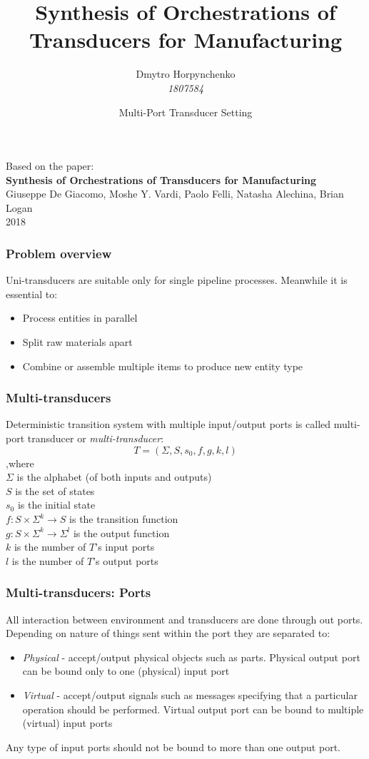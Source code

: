 \documentclass{beamer}
\title{\textbf{Synthesis of Orchestrations of Transducers for Manufacturing}}
\author[Dmytro]{Dmytro Horpynchenko\\
\textit{1807584}}
\date[May 13, 2019]{Multi-Port Transducer Setting}
\institute[Roma]{Università di Roma}
\theoremstyle{definition}
\theoremstyle{plain}
\begin{document}
\titlepageframe %

\begin{frame}
Based on the paper:
\\
\textbf{Synthesis of Orchestrations of Transducers for Manufacturing}
\\
Giuseppe De Giacomo, Moshe Y. Vardi, Paolo Felli, Natasha Alechina, Brian Logan
\\
2018
\end{frame}

\begin{frame}
\frametitle{Problem overview}
Uni-transducers are suitable only for  single pipeline processes.
Meanwhile it is essential to:
\begin{itemize}
\item Process entities in parallel
\item Split raw materials apart
\item Combine or assemble multiple items  to produce new entity type
\end{itemize}
\end{frame}

\begin{frame}
\frametitle{Multi-transducers}
Deterministic transition system with multiple input/output ports is called multi-port transducer or \textit{multi-transducer}:
$$ T = (\Sigma, S, s_{0}, f, g, k, l) $$
,where\\
$\Sigma$ is the alphabet (of both inputs and outputs)\\
$S$ is the set of states\\
$s_{0}$ is the initial state\\
$f : S \times \Sigma^{k} \to S$ is the transition function\\
$ g : S \times \Sigma^{k} \to \Sigma^{l}$ is the output function\\
$k$ is the number of $T$'s input ports\\
$l$ is the number of $T$'s output ports
\end{frame}

\begin{frame}
\frametitle{Multi-transducers: Ports}
All interaction between environment and transducers are done through out ports.
\\
Depending on nature of things sent within the port they are separated to:
\begin{itemize}
\item \textit{Physical} - accept/output physical objects such as parts. Physical output port can be bound only
to one (physical) input port
\item \textit{Virtual} - accept/output signals such as messages specifying that a particular operation should be performed. Virtual output port can be bound to multiple (virtual) input ports
\end{itemize}
Any type of input ports should not be bound to more than one output port.
\end{frame}
\end{document}
